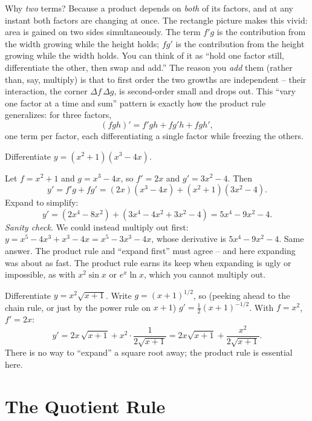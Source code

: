 \begin{whybox}
Why \emph{two} terms? Because a product depends on \emph{both} of its factors, and at any
instant both factors are changing at once. The rectangle picture makes this vivid: area
is gained on two sides simultaneously. The term $f'g$ is the contribution from the width
growing while the height holds; $fg'$ is the contribution from the height growing while
the width holds. You can think of it as ``hold one factor still, differentiate the other,
then swap and add.'' The reason you \emph{add} them (rather than, say, multiply) is that
to first order the two growths are independent -- their interaction, the corner
$\Delta f\,\Delta g$, is second-order small and drops out. This ``vary one factor at a
time and sum'' pattern is exactly how the product rule generalizes: for three factors,
\[
  (fgh)' = f'gh + fg'h + fgh',
\]
one term per factor, each differentiating a single factor while freezing the others.
\end{whybox}

\begin{example}\label{ch11:ex-prod1}
Differentiate $y = (x^2+1)(x^3 - 4x)$.

Let $f = x^2+1$ and $g = x^3 - 4x$, so $f' = 2x$ and $g' = 3x^2 - 4$. Then
\[
  y' = f'g + fg' = (2x)(x^3-4x) + (x^2+1)(3x^2-4).
\]
Expand to simplify:
\[
  y' = (2x^4 - 8x^2) + (3x^4 - 4x^2 + 3x^2 - 4) = 5x^4 - 9x^2 - 4 .
\]
\emph{Sanity check.} We could instead multiply out first:
$y = x^5 - 4x^3 + x^3 - 4x = x^5 - 3x^3 - 4x$, whose derivative is
$5x^4 - 9x^2 - 4$. Same answer. The product rule and ``expand first'' must agree -- and
here expanding was about as fast. The product rule earns its keep when expanding is
ugly or impossible, as with $x^2\sin x$ or $e^x\ln x$, which you cannot multiply out.
\end{example}

\begin{example}\label{ch11:ex-prod2}
Differentiate $y = x^2 \sqrt{x+1}$. Write $g=(x+1)^{1/2}$, so (peeking ahead to the chain
rule, or just by the power rule on $x+1$) $g' = \tfrac12 (x+1)^{-1/2}$. With $f=x^2$,
$f'=2x$:
\[
  y' = 2x\,\sqrt{x+1} + x^2\cdot\frac{1}{2\sqrt{x+1}}
     = 2x\sqrt{x+1} + \frac{x^2}{2\sqrt{x+1}} .
\]
There is no way to ``expand'' a square root away; the product rule is essential here.
\end{example}

\section{The Quotient Rule}
\label{ch11:quotient-rule}


